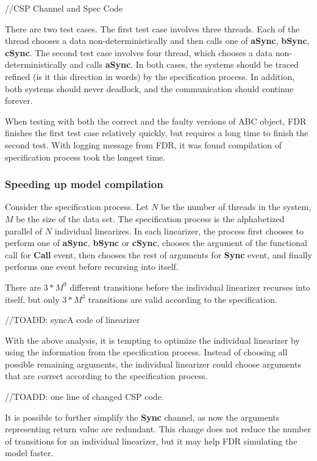 \documentclass{article}
\begin{document}
//CSP Channel and Spec Code

There are two test cases. The first test case involves three threads. Each of the thread chooses a data non-deterministically and then calls one of \textbf{aSync}, \textbf{bSync}, \textbf{cSync}. The second test case involves four thread, which chooses a data non-deterministically and calls \textbf{aSync}. In both cases, the systems should be traced refined (is it this direction in words) by the specification process. In addition, both systems should never deadlock, and the communication should continue forever.

When testing with both the correct and the faulty versions of ABC object, FDR finishes the first test case relatively quickly, but requires a long time to finish the second test. With logging message from FDR, it was found compilation of specification process took the longest time. 

\subsubsection{Speeding up model compilation}
Consider the specification process. Let $N$ be the number of threads in the system, $M$ be the size of the data set. The specification process is the alphabetized parallel of $N$ individual linearizes. In each linearizer, the process first chooses to perform one of \textbf{aSync}, \textbf{bSync} or \textbf{cSync}, chooses the argument of the functional call for \textbf{Call} event, then chooses the rest of arguments for \textbf{Sync} event, and finally performs one event before recursing into itself.

There are $3*M^9$ different transitions before the individual linearizer recurses into itself, but only $3*M^3$ transitions are valid according to the specification. 

//TOADD: syncA code of linearizer

With the above analysis, it is tempting to optimize the individual linearizer by using the information from the specification process. Instead of choosing all possible remaining arguments, the individual linearizer could choose arguments that are correct according to the specification process.

//TOADD: one line of changed CSP code.

It is possible to further simplify the \textbf{Sync} channel, as now the arguments representing return value are redundant. This change does not reduce the number of transitions for an individual linearizer, but it may help FDR simulating the model faster.
\end{document}
